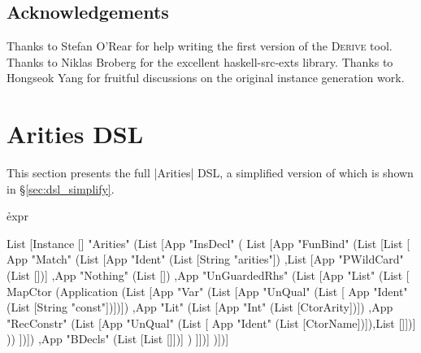 \documentclass[preprint,draft]{sigplanconf}
\newcommand{\derive}{\textsc{Derive}}
\begin{document}
\subsection*{Acknowledgements}

Thanks to Stefan O'Rear for help writing the first version of the \derive{} tool. Thanks to Niklas Broberg for the excellent haskell-src-exts library. Thanks to Hongseok Yang for fruitful discussions on the original instance generation work.

\appendix

\section{Arities DSL}
\label{sec:arities_full}

This section presents the full |Arities| DSL, a simplified version of which is shown in \S\ref{sec:dsl_simplify}.

\h{expr}\begin{code}
List [Instance [] "Arities" (List [App "InsDecl" (
    List [App "FunBind" (List [List [
        App "Match" (List
            [App "Ident" (List [String "arities"])
            ,List [App "PWildCard" (List [])]
            ,App "Nothing" (List [])
            ,App "UnGuardedRhs" (List [App "List" (List [
                MapCtor (Application (List
                    [App "Var" (List [App "UnQual" (List [
                        App "Ident" (List [String "const"])])])
                    ,App "Lit" (List [App "Int" (List [CtorArity])])
                    ,App "RecConstr" (List [App "UnQual" (List [
                        App "Ident" (List [CtorName])]),List []])]
                ))
            ])])
            ,App "BDecls" (List [List []])]
        )
    ]])]
)])]
\end{code}


\balance

\end{document}
